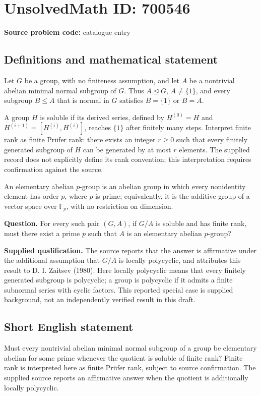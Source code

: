 \documentclass[11pt]{article}
\newcommand{\F}{\mathbb{F}}
\begin{document}
\section*{UnsolvedMath ID: 700546}
\textbf{Source problem code:} catalogue entry
\subsection{Definitions and mathematical statement}
Let \(G\) be a group, with no finiteness assumption, and let \(A\) be a nontrivial abelian minimal normal subgroup of \(G\). Thus \(A\trianglelefteq G\), \(A\neq\{1\}\), and every subgroup \(B\leq A\) that is normal in \(G\) satisfies \(B=\{1\}\) or \(B=A\).

A group \(H\) is soluble if its derived series, defined by \(H^{(0)}=H\) and \(H^{(i+1)}=[H^{(i)},H^{(i)}]\), reaches \(\{1\}\) after finitely many steps. Interpret finite rank as finite Pr\"ufer rank: there exists an integer \(r\geq 0\) such that every finitely generated subgroup of \(H\) can be generated by at most \(r\) elements. The supplied record does not explicitly define its rank convention; this interpretation requires confirmation against the source.

An elementary abelian \(p\)-group is an abelian group in which every nonidentity element has order \(p\), where \(p\) is prime; equivalently, it is the additive group of a vector space over \(\F_p\), with no restriction on dimension.

\textbf{Question.} For every such pair \((G,A)\), if \(G/A\) is soluble and has finite rank, must there exist a prime \(p\) such that \(A\) is an elementary abelian \(p\)-group?

\textbf{Supplied qualification.} The source reports that the answer is affirmative under the additional assumption that \(G/A\) is locally polycyclic, and attributes this result to D. I. Zaitsev (1980). Here locally polycyclic means that every finitely generated subgroup is polycyclic; a group is polycyclic if it admits a finite subnormal series with cyclic factors. This reported special case is supplied background, not an independently verified result in this draft.
\subsection{Short English statement}
Must every nontrivial abelian minimal normal subgroup of a group be elementary abelian for some prime whenever the quotient is soluble of finite rank? Finite rank is interpreted here as finite Pr\"ufer rank, subject to source confirmation. The supplied source reports an affirmative answer when the quotient is additionally locally polycyclic.
\end{document}
